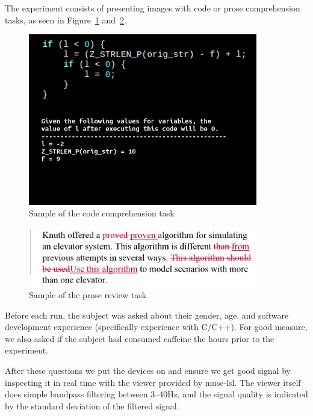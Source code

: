             The experiment consists of presenting images with code or prose comprehension tasks, as seen in Figure~\ref{fig:codetask} and~\ref{fig:prosetask}.

            \begin{figure}
                \begin{center}
                    \includegraphics[trim=0 120 0 0,clip,width=100mm]{img/final-1-1.png}
                \end{center}
                \caption{Sample of the code comprehension task}\label{fig:codetask}
            \end{figure}

            \begin{figure}
                \begin{center}
                    \includegraphics[width=100mm]{img/bugs_1.PNG}
                \end{center}
                \caption{Sample of the prose review task}\label{fig:prosetask}
            \end{figure}

            Before each run, the subject was asked about their gender, age, and software development experience (specifically experience with C/C++). For good measure, we also asked if the subject had consumed caffeine the hours prior to the experiment.

            After these questions we put the devices on and ensure we get good signal by inspecting it in real time with the viewer provided by muse-lsl. The viewer itself does simple bandpass filtering between 3--40Hz, and the signal quality is indicated by the standard deviation of the filtered signal.

